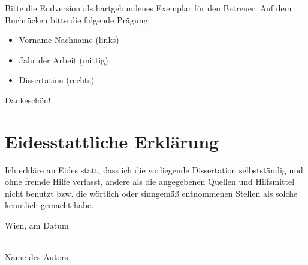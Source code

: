 \vfill

Bitte die Endversion als hartgebundenes Exemplar für den Betreuer. Auf dem Buchrücken bitte die folgende Prägung:
\begin{itemize}
\item Vorname Nachname (links)
\item Jahr der Arbeit (mittig)
\item Dissertation (rechts)
\end{itemize}
Dankeschön!

\cleardoublepage


\chapter*{Eidesstattliche Erkl\"arung}
\thispagestyle{empty}

\vspace*{2cm}

Ich erkl\"are an Eides statt, dass ich die vorliegende Dissertation selbstst\"andig und ohne fremde Hilfe verfasst, andere als die angegebenen Quellen und Hilfsmittel nicht benutzt bzw. die w\"ortlich oder sinngem\"a{\ss} entnommenen Stellen als solche kenntlich gemacht habe.

\vspace*{3cm}

\noindent
Wien, am {\color{change}Datum} %
%
\hfill 
%
\begin{minipage}[t]{5cm}
\centering
\underline{\hspace*{5cm}}\\
\small\color{change}Name des Autors
\end{minipage}